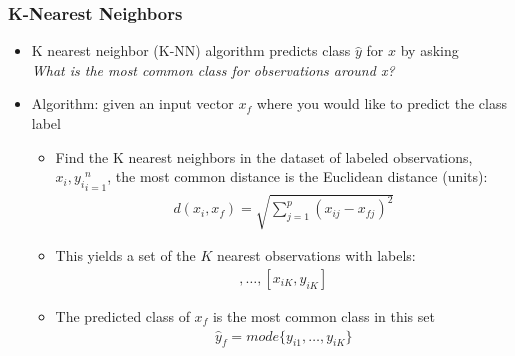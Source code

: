 \documentclass[
  shownotes,
  xcolor={svgnames},
  hyperref={colorlinks,citecolor=DarkBlue,linkcolor=DarkRed,urlcolor=DarkBlue}
  , aspectratio=169]{beamer}
\begin{document}
\begin{frame}[fragile]
\frametitle{K-Nearest Neighbors}

\begin{itemize}
\item K nearest neighbor (K-NN) algorithm predicts class $\hat y$ for $x$ by asking \\
{\it What is the most common class for observations around x?}
\item Algorithm: given an input vector $x_f$ where you would like to predict the class label

\begin{itemize}
  \item Find the K nearest neighbors in the dataset of labeled observations, ${x_i,y_i}_{i=1}^n$, the most common distance is the Euclidean distance (units):
  \begin{align}
  d(x_i,x_f)=\sqrt{\sum_{j=1}^p(x_{ij}-x_{fj})^2}
  \end{align}
  \item This yields a set of the $K$ nearest observations with labels: 
  \begin{align}
  [x_{i1},y_{i1}],\dots,[x_{iK},y_{iK}]
  \end{align}
  \item The predicted class of $x_f$ is the most common class in this set
  \begin{align}
  \hat{y}_f =mode\{y_{i1},\dots,y_{iK}\}
  \end{align}
\end{itemize}

\end{itemize}
\end{frame}
\end{document}
